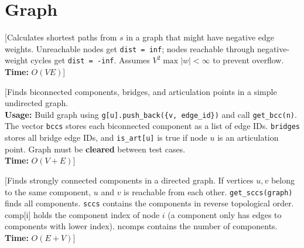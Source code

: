 \chapter{Graph}


[Calculates shortest paths from $s$ in a graph that might have negative edge weights. Unreachable nodes get \texttt{dist = inf}; nodes reachable through negative-weight cycles get \texttt{dist = -inf}. Assumes $V^2 \max |w| < \infty$ to prevent overflow. \\
\textbf{Time:} {$O(VE)$}]


[Finds biconnected components, bridges, and articulation points in a simple undirected graph. \\
\textbf{Usage:} Build graph using \texttt{g[u].push\_back(\{v, edge\_id\})} and call \texttt{get\_bcc(n)}.
The vector \texttt{bccs} stores each biconnected component as a list of edge IDs.
\texttt{bridges} stores all bridge edge IDs, and \texttt{is\_art[u]} is true if node $u$ is an articulation point.
Graph must be \textbf{cleared} between test cases. \\
\textbf{Time:} {$O(V + E)$}]



[Finds strongly connected components in a directed graph. 
If vertices $u, v$ belong to the same component, $u$ and $v$ is reachable from each other.
\texttt{get\_sccs(graph)} finds all components.
\texttt{sccs} contains the components in reverse topological order. comp[i] holds the component
index of node $i$ (a component only has edges to components with lower index).
ncomps contains the number of components. \\
\textbf{Time:} {$O(E+V)$}]


